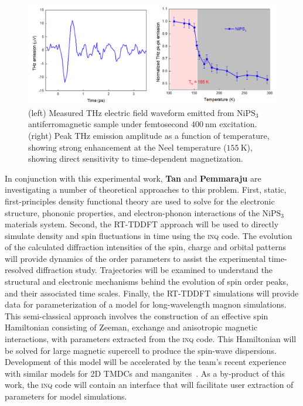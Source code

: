 \begin{figure}[ht]
	\centering\includegraphics[width=1.0\linewidth]{figures/NiPS3}
	\caption{
		(left)  Measured THz electric field waveform emitted from \(\mathrm{NiPS_3}\) antiferromagnetic sample under femtosecond \(400~\mathrm{nm}\) excitation.
		(right) Peak THz emission amplitude as a function of temperature, showing strong enhancement at the Neel temperature (\(155~\mathrm{K}\)), showing direct sensitivity to time-dependent magnetization.
	}
	\label{fig:NiPS3}
\end{figure}

In conjunction with this experimental work, {\bf Tan} and {\bf Pemmaraju} are investigating a number of theoretical approaches to this problem.
First, static, first-principles density functional theory are used to solve for the electronic structure, phononic properties, and electron-phonon interactions of the \(\mathrm{NiPS_3}\) materials system. 
Second, the RT-TDDFT approach will be used to directly simulate density and spin fluctuations in time using the \textsc{inq} code.
The evolution of the calculated diffraction intensities of the spin, charge and orbital patterns will provide dynamics of the order parameters to assist the experimental time-resolved diffraction study.
Trajectories will be examined to understand the structural and electronic mechanisms behind the evolution of spin order peaks, and their associated time scales. 
Finally, the RT-TDDFT simulations will provide data for parameterization of a model for long-wavelength magnon simulations. 
This semi-classical approach involves the construction of an effective spin Hamiltonian consisting of Zeeman, exchange and anisotropic magnetic interactions, with parameters extracted from the \textsc{inq} code. 
This Hamiltonian will be solved for large magnetic supercell to produce the spin-wave dispersions. 
Development of this model will be accelerated by the team's recent experience with similar models for 2D TMDCs and manganites~\cite{Siddiqui2020, Rajpurohit2020}. 
As a by-product of this work, the \textsc{inq} code will contain an interface that will facilitate user extraction of parameters for model simulations.

